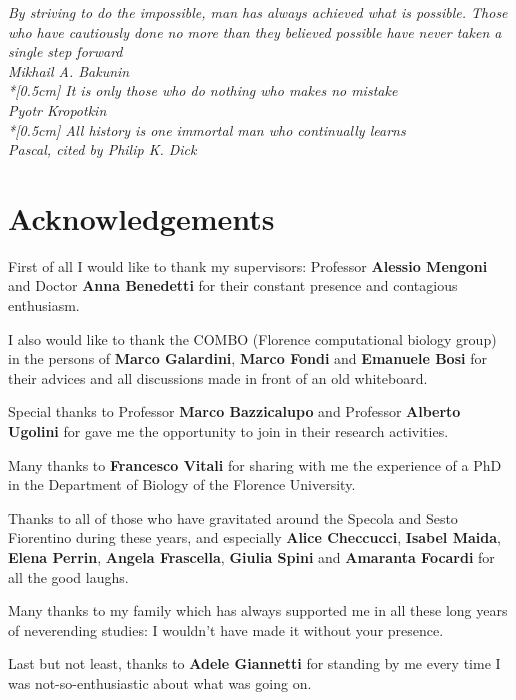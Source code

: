 
\thispagestyle{empty}

\begin{flushright}{\slshape
	\textit{By striving to do the impossible, man has always achieved what is possible. Those who have cautiously done no more than they believed possible have never taken a single step forward} \\
	Mikhail A. Bakunin\\*[0.5cm]
	\textit{It is only those who do nothing who makes no mistake} \\
	Pyotr Kropotkin\\*[0.5cm]
	\textit{All history is one immortal man who continually learns} \\
	Pascal, cited by Philip K. Dick \\
	}
\end{flushright}



\newpage

\begingroup
\let\clearpage\relax
\let\cleardoublepage\relax
\let\cleardoublepage\relax

\chapter{Acknowledgements}

{\small
First of all I would like to thank my supervisors: Professor \textbf{Alessio Mengoni} and Doctor \textbf{Anna Benedetti} for their constant presence and contagious enthusiasm.

\noindent I also would like to thank the COMBO (Florence computational biology group) in the persons of \textbf{Marco Galardini}, \textbf{Marco Fondi} and \textbf{Emanuele Bosi} for their advices and all discussions made in front of an old whiteboard.

\noindent Special thanks to Professor \textbf{Marco Bazzicalupo} and Professor \textbf{Alberto Ugolini} for gave me the opportunity to join in their research activities.

\noindent Many thanks to \textbf{Francesco Vitali} for sharing with me the experience of a PhD in the Department of Biology of the Florence University.

\noindent Thanks to all of those who have gravitated around the Specola and Sesto Fiorentino during these years, and especially \textbf{Alice Checcucci}, \textbf{Isabel Maida}, \textbf{Elena Perrin}, \textbf{Angela Frascella}, \textbf{Giulia Spini} and \textbf{Amaranta Focardi} for all the good laughs.

\noindent Many thanks to my family which has always supported me in all these long years of neverending studies: I wouldn't have made it without your presence.

\noindent Last but not least, thanks to \textbf{Adele Giannetti} for standing by me every time I was not-so-enthusiastic about what was going on.
}

\endgroup



